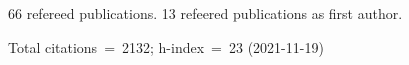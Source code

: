 66 refereed publications. 13 refeered publications as first author.

Total citations~=~2132; h-index~=~23 (2021-11-19)